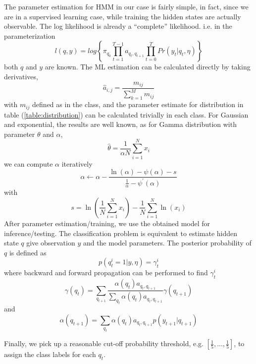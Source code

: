 The parameter estimation for HMM in our case is fairly simple, in fact, since we are in a supervised learning case, while training the hidden states are actually observable. The log likelihood is already a ``complete'' likelihood. i.e. in the parameterization
\begin{equation} \nonumber
l(q,y) = log\left\{\pi_{q_0}\prod_{t=1}^{T-1} a_{q_t,q_{t+1}}\prod_{t=0}^T Pr(y_t|q_t,\eta)\right\}
\end{equation}
both $q$ and $y$ are known. The ML estimation can be calculated directly by taking derivatives,
\begin{equation} \nonumber
\hat{a}_{i,j} = \frac{m_{ij}}{\sum_{k=1}^M m_{ij}}
\end{equation}
with $m_{ij}$ defined as in the class, and the parameter estimate for distribution in table (\ref{table:distribution}) can be calculated trivially in each class. For Gaussian and exponential, the results are well known, as for Gamma distribution with parameter $\theta$ and $\alpha$,
\begin{equation}
\hat{\theta} = \frac{1}{\alpha N}\sum_{i=1}^Nx_i
\end{equation}
we can compute $\alpha$ iteratively 
\begin{equation}
\alpha \leftarrow \alpha - \frac{ \ln(\alpha) - \psi(\alpha) - s }{ \frac{1}{\alpha} - \psi^{\prime}(\alpha) }
\end{equation}
with 
\begin{equation} \nonumber
s = \ln{\left(\frac{1}{N}\sum_{i=1}^N x_i\right)} - \frac{1}{N}\sum_{i=1}^N\ln{(x_i)}
\end{equation}
After parameter estimation/training, we use the obtained model for inference/testing. The classification problem is equivalent to estimate hidden state $q$ give observation $y$ and the model parameters. The posterior probability of $q$ is defined as 
\begin{equation} \nonumber
p(q_t^i=1|y,\eta) = \gamma_t^i
\end{equation} 
where backward and forward propagation can be performed to find $\gamma_t^i$
\begin{equation}
\gamma (q_t) = \sum_{q_{t+1}} \frac{\alpha (q_t) a_{q_t,q_{t+1}}}{\sum_{q_t} \alpha (q_t)a_{q_t,q_{t+1}}} \gamma (q_{t+1})
\end{equation}
and
\begin{equation}
\alpha (q_{t+1}) = \sum_{q_t} \alpha (q_t)  a_{q_t,q_{t+1}} p(y_{t+1}|q_{t+1})
\end{equation}

Finally, we pick up a reasonable cut-off probability threshold, e.g. $[\frac{1}{5},...,\frac{1}{5}]$, to assign the class labels for each $q_t$.

